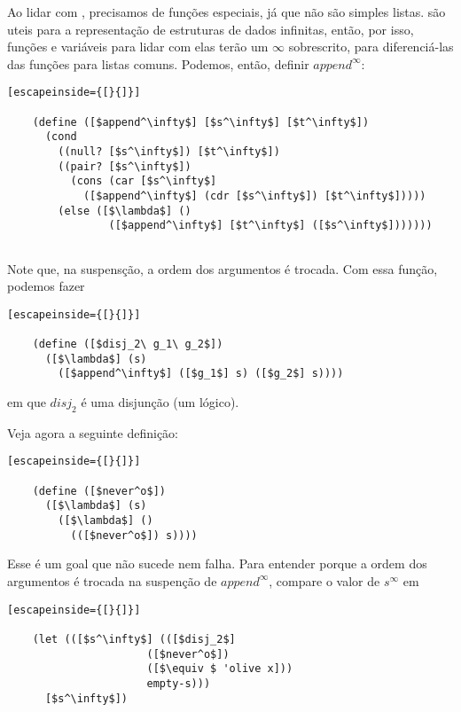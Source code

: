   Ao lidar com , precisamos de funções especiais,
  já que não são simples listas.  são uteis para a
  representação de estruturas de dados infinitas, então, por isso,
  funções e variáveis para lidar com elas terão um $\infty$ sobrescrito,
  para diferenciá-las das funções para listas comuns. Podemos, então,
  definir $append^\infty$:

  \begin{lstlisting}[escapeinside={[}{]}]

    (define ([$append^\infty$] [$s^\infty$] [$t^\infty$])
      (cond
        ((null? [$s^\infty$]) [$t^\infty$])
        ((pair? [$s^\infty$])
          (cons (car [$s^\infty$]
            ([$append^\infty$] (cdr [$s^\infty$]) [$t^\infty$]))))
        (else ([$\lambda$] ()
                ([$append^\infty$] [$t^\infty$] ([$s^\infty$]))))))
        
  \end{lstlisting}

  \noindent Note que, na suspensção, a ordem dos argumentos é trocada.
  Com essa função, podemos fazer

  \begin{lstlisting}[escapeinside={[}{]}]

    (define ([$disj_2\ g_1\ g_2$])
      ([$\lambda$] (s)
        ([$append^\infty$] ([$g_1$] s) ([$g_2$] s))))

  \end{lstlisting}
      
  \noindent em que $disj_2$ é uma disjunção (um 
  lógico). 

  Veja agora a seguinte definição:

  \begin{lstlisting}[escapeinside={[}{]}]

    (define ([$never^o$])
      ([$\lambda$] (s)
        ([$\lambda$] ()
          (([$never^o$]) s))))

  \end{lstlisting}

  \noindent Esse é um goal que não sucede nem falha. Para entender
  porque a ordem dos argumentos é trocada na suspenção de $append^\infty$,
  compare o valor de $s^\infty$ em

  \begin{lstlisting}[escapeinside={[}{]}]

    (let (([$s^\infty$] (([$disj_2$]
                      ([$never^o$])
                      ([$\equiv $ 'olive x]))
                      empty-s)))
      [$s^\infty$])
                      
  \end{lstlisting}

